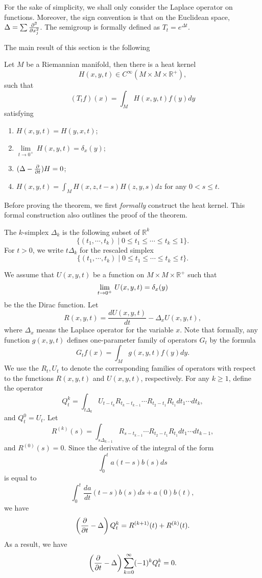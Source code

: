 For the sake of simplicity, we shall only consider the Laplace operator on functions. Moreover, the sign convention is that on the Euclidean space, $\Delta=\sum\frac{\partial^2}{\partial x_j^2}$.
The semigroup is formally defined as $T_t=e^{\Delta t}$.

The main result of this section is the following



\begin{theorem}
Let $M$ be a  Riemannian manifold, then there is a heat kernel
\[
H(x,y,t)\in C^\infty(M\times M\times\mathbb R^+),
\]
such that 
\[
(T_t f)(x)=\int_M H(x,y,t) f(y)dy
\]
satisfying
\begin{enumerate}
\item $H(x,y,t)=H(y,x,t)$;
\item $\underset{t\to 0^+}{\lim}\, H(x,y,t)=\delta_x(y)$;
\item $(\Delta-\frac{\partial}{\partial t})H=0$;
\item $H(x,y,t)=\int_M H(x,z,t-s)H(z,y,s) dz$ for any $0<s\leq t$.
\end{enumerate}
\end{theorem}


Before proving the theorem, we first {\it formally} construct  the heat kernel. This formal construction also outlines the proof of the theorem.



The $k$-simplex $\Delta_k$ is the following subset of $\mathbb R^k$
\[
\{(t_1,\cdots,t_k)\mid 0\leq t_1\leq\cdots\leq t_k\leq 1\}.
\]
For $t>0$, we write $t\Delta_k$ for the rescaled simplex 
\[
\{(t_1,\cdots,t_k)\mid 0\leq t_1\leq\cdots\leq t_k\leq t\}.
\]

We assume that $U(x,y,t)$ be a function on $M\times M\times\mathbb R^+$ such that 
\[
\lim_{t\to 0^+}\, U(x,y,t)=\delta_x(y)
\]
 be the the Dirac function. Let
\[
R(x,y,t)=\frac{d U(x,y,t)}{dt}-\Delta_x U(x,y,t),
\]
where $\Delta_x$ means the Laplace  operator for the variable $x$. Note that formally, any function $g(x,y,t)$ defines one-parameter family of operators $G_t$ by the formula
\[
G_t f(x)=\int_M g(x,y,t) f(y) dy.
\]
We use the $R_t, U_t$ to denote  the corresponding families of operators with respect to the functions $R(x,y,t)$ and $U(x,y,t)$, respectively. For any $k\geq 1$,
define the operator
\[
Q_t^k=\int_{t\Delta_k} U_{t-t_k}R_{t_k-t_{k-1}}\cdots R_{t_2-t_1}R_{t_1} dt_1\cdots dt_k,
\]
and $Q_t^0=U_t$. Let
\[
R^{(k)} (s)=\int_{s\Delta_{k-1}}R_{s-t_{k-1}}\cdots R_{t_2-t_1} R_{t_1} dt_1\cdots dt_{k-1},
\]
and $R^{(0)}(s)=0$.
Since the derivative of the integral of the form $$\int_0^t a(t-s) b(s) ds$$ is equal to 
\[
\int_0^t\frac{da}{dt}(t-s) b(s) ds+a(0) b(t),
\]
we have
\[
\left(\frac{\partial}{\partial t}-\Delta\right )Q_t^k=R^{(k+1)} (t)+R^{(k)} (t).
\]
As a result, we have
\[
\left(\frac{\partial}{\partial t}-\Delta\right )\sum_{k=0}^\infty (-1)^k Q_t^k=0.
\]

